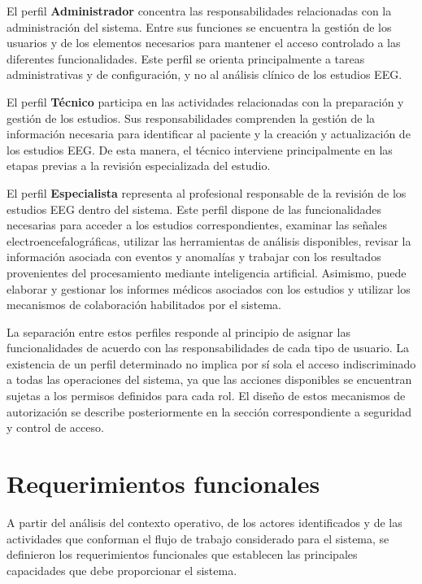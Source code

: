 El perfil \textbf{Administrador} concentra las responsabilidades relacionadas
con la administración del sistema. Entre sus funciones se encuentra la gestión
de los usuarios y de los elementos necesarios para mantener el acceso
controlado a las diferentes funcionalidades. Este perfil se orienta
principalmente a tareas administrativas y de configuración, y no al análisis
clínico de los estudios EEG.

El perfil \textbf{Técnico} participa en las actividades relacionadas con la
preparación y gestión de los estudios. Sus responsabilidades comprenden la
gestión de la información necesaria para identificar al paciente y la creación
y actualización de los estudios EEG. De esta manera, el técnico interviene
principalmente en las etapas previas a la revisión especializada del estudio.

El perfil \textbf{Especialista} representa al profesional responsable de la
revisión de los estudios EEG dentro del sistema. Este perfil dispone de las
funcionalidades necesarias para acceder a los estudios correspondientes,
examinar las señales electroencefalográficas, utilizar las herramientas de
análisis disponibles, revisar la información asociada con eventos y anomalías
y trabajar con los resultados provenientes del procesamiento mediante
inteligencia artificial. Asimismo, puede elaborar y gestionar los informes
médicos asociados con los estudios y utilizar los mecanismos de colaboración
habilitados por el sistema.

La separación entre estos perfiles responde al principio de asignar las
funcionalidades de acuerdo con las responsabilidades de cada tipo de usuario.
La existencia de un perfil determinado no implica por sí sola el acceso
indiscriminado a todas las operaciones del sistema, ya que las acciones
disponibles se encuentran sujetas a los permisos definidos para cada rol. El
diseño de estos mecanismos de autorización se describe posteriormente en la
sección correspondiente a seguridad y control de acceso.

\section{Requerimientos funcionales}
\label{sec:requerimientos-funcionales}

A partir del análisis del contexto operativo, de los actores identificados y
de las actividades que conforman el flujo de trabajo considerado para
el sistema, se definieron los requerimientos funcionales que establecen las
principales capacidades que debe proporcionar el sistema.

